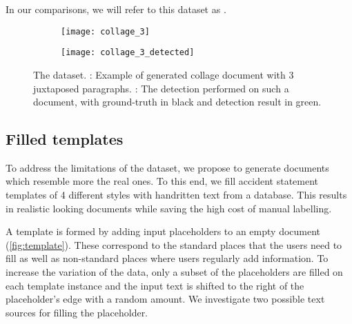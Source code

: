 		In our comparisons, we will refer to this dataset as .


		\begin{figure}
			\centering
			\begin{subfigure}[c]{\textwidth}
				\texttt{[image: collage\_3]}
				\caption{}
				\label{sfig:collage_clean}
			\end{subfigure}
			\vspace{1em}

			\begin{subfigure}[c]{\textwidth}
				\texttt{[image: collage\_3\_detected]}
				\caption{}
				\label{sfig:collage_detect}
			\end{subfigure}
			\caption[ dataset]{
				The  dataset.
				: Example of generated collage document with 3 juxtaposed paragraphs.
				: The detection performed on such a document, with ground-truth in black and detection result in green.
			}
			\label{fig:collage}
		\end{figure}


	\subsection{Filled templates}

			To address the limitations of the  dataset, we propose to generate documents which resemble more the real ones. To this end, we fill accident statement templates of 4 different styles with handritten text from a database. This results in realistic looking documents while saving the high cost of manual labelling.

			A template is formed by adding input placeholders to an empty document (\autoref{fig:template}). These correspond to the standard places that the users need to fill as well as non-standard places where users regularly add information. To increase the variation of the data, only a subset of the placeholders are filled on each template instance and the input text is shifted to the right of the placeholder's edge with a random amount. We investigate two possible text sources for filling the placeholder.

